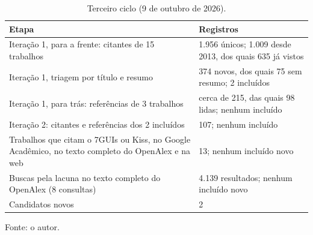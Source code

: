 \begin{table}[htbp]
\centering
\caption{\label{tab:revisaoRodada3}Terceiro ciclo (9 de outubro de 2026).}
\small
\begin{tabular}{p{}p{}}
\hline
Etapa & Registros \\
\hline
Iteração 1, para a frente: citantes de 15 trabalhos & 1.956 únicos; 1.009 desde 2013, dos quais 635 já vistos \\
Iteração 1, triagem por título e resumo & 374 novos, dos quais 75 sem resumo; 2 incluídos \\
Iteração 1, para trás: referências de 3 trabalhos & cerca de 215, das quais 98 lidas; nenhum incluído \\
Iteração 2: citantes e referências dos 2 incluídos & 107; nenhum incluído \\
Trabalhos que citam o 7GUIs ou Kiss, no Google Acadêmico, no texto completo do OpenAlex e na web & 13; nenhum incluído novo \\
Buscas pela lacuna no texto completo do OpenAlex (8 consultas) & 4.139 resultados; nenhum incluído novo \\
Candidatos novos & 2 \\
\hline
\end{tabular}

Fonte: o autor.
\end{table}
